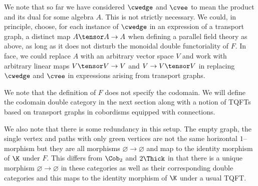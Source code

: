 \begin{rmk}\label{rmk:any_vect_space}
We note that so far we have considered $\cwedge$ and $\cvee$ to mean the product
and its dual for some algebra $A$. This is not strictly necessary. We could, in
principle, choose, for each instance of $\cwedge$ in an expression of a
transport graph, a distinct map $A \tensor A \to A$ when defining a parallel
field theory as above, as long as it does not disturb the monoidal double
functoriality of $F$. In face, we could replace $A$ with an arbitrary vector
space $V$ and work with arbitrary linear maps $V \tensor V \to V$ and
$V \to V \tensor V$ in replacing $\cwedge$ and $\cvee$ in expressions arising
from transport graphs.
\end{rmk}

We note that the definition of $F$ does not specify the codomain. We will define
the codomain double category in the next section along with a notion of TQFTs
based on transport graphs in cobordisms equipped with connections.

We also note that there is some redundancy in this setup. The empty graph, the
single vertex and paths with only green vertices are not the same horizontal
$1$--morphism but they are all morphisms $\varnothing \to \varnothing$ and map
to the identity morphism of $\K$ under $F$. This differs from $\Cob_2$ and
$2\Thick$ in that there is a unique morphism $\varnothing \to \varnothing$ in
these categories as well as their corresponding double categories and this maps
to the identity morphism of $\K$ under a usual TQFT.

